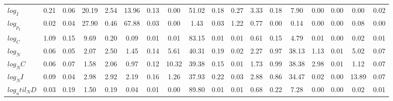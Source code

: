 \begin{center}
\begin{longtable}{lccccccccccccccccc}
$log_I        $	 & 	            0.21	 & 	            0.06	 & 	           20.19	 & 	            2.54	 & 	           13.96	 & 	            0.13	 & 	            0.00	 & 	           51.02	 & 	            0.18	 & 	            0.27	 & 	            3.33	 & 	            0.18	 & 	            7.90	 & 	            0.00	 & 	            0.00	 & 	            0.00	 & 	            0.02 \\ 
$log_p_I      $	 & 	            0.02	 & 	            0.04	 & 	           27.90	 & 	            0.46	 & 	           67.88	 & 	            0.03	 & 	            0.00	 & 	            1.43	 & 	            0.03	 & 	            1.22	 & 	            0.77	 & 	            0.00	 & 	            0.14	 & 	            0.00	 & 	            0.00	 & 	            0.08	 & 	            0.00 \\ 
$log_C        $	 & 	            1.09	 & 	            0.15	 & 	            9.69	 & 	            0.20	 & 	            0.09	 & 	            0.01	 & 	            0.01	 & 	           83.15	 & 	            0.01	 & 	            0.01	 & 	            0.61	 & 	            0.15	 & 	            4.79	 & 	            0.01	 & 	            0.00	 & 	            0.02	 & 	            0.01 \\ 
$log_N        $	 & 	            0.06	 & 	            0.05	 & 	            2.07	 & 	            2.50	 & 	            1.45	 & 	            0.14	 & 	            5.61	 & 	           40.31	 & 	            0.19	 & 	            0.02	 & 	            2.27	 & 	            0.97	 & 	           38.13	 & 	            1.13	 & 	            0.01	 & 	            5.02	 & 	            0.07 \\ 
$log_NC       $	 & 	            0.06	 & 	            0.07	 & 	            1.58	 & 	            2.06	 & 	            0.97	 & 	            0.12	 & 	           10.32	 & 	           39.38	 & 	            0.15	 & 	            0.01	 & 	            1.73	 & 	            0.99	 & 	           38.38	 & 	            2.98	 & 	            0.01	 & 	            1.12	 & 	            0.07 \\ 
$log_NI       $	 & 	            0.09	 & 	            0.04	 & 	            2.98	 & 	            2.92	 & 	            2.19	 & 	            0.16	 & 	            1.26	 & 	           37.93	 & 	            0.22	 & 	            0.03	 & 	            2.88	 & 	            0.86	 & 	           34.47	 & 	            0.02	 & 	            0.00	 & 	           13.89	 & 	            0.07 \\ 
$log_util_ND  $	 & 	            0.03	 & 	            0.19	 & 	            1.50	 & 	            0.19	 & 	            0.04	 & 	            0.01	 & 	            0.00	 & 	           89.80	 & 	            0.01	 & 	            0.01	 & 	            0.68	 & 	            0.22	 & 	            7.28	 & 	            0.00	 & 	            0.00	 & 	            0.02	 & 	            0.01 \\ 

\end{longtable}
\end{center}
